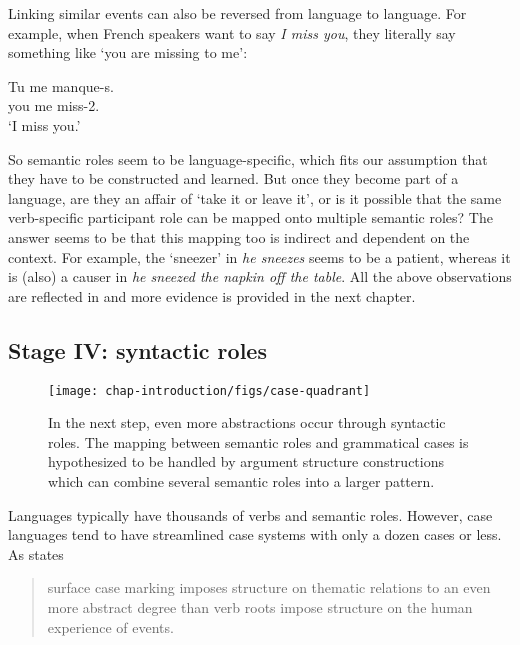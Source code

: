 Linking similar events can also be reversed from language to language. For example, when French speakers want to say {\em I miss you}, they literally say something like `you are missing to me':

\ea
\gll Tu me manque-s. \\
you me miss-2{\sg}.{\prs} \\
\glt `I miss you.' \\
\z


So semantic roles seem to be language-specific, which fits our assumption that they have to be constructed and learned. But once they become part of a language, are they an affair of `take it or leave it', or is it possible that the same verb-specific participant role can be mapped onto multiple semantic roles? The answer seems to be that this mapping too is indirect and dependent on the context. For example, the `sneezer' in {\em he sneezes} seems to be a patient, whereas it is (also) a causer in {\em he sneezed the napkin off the table}. All the above observations are reflected in  and more evidence is provided in the next chapter.

\subsection{Stage IV: syntactic roles}
\label{s:stage4}

\begin{figure}[t]
\centerline{\texttt{[image: chap-introduction/figs/case-quadrant]}}
  \caption[Formation of case markers: stage IV]{In the next step, even more abstractions occur through syntactic roles. The mapping between semantic roles and grammatical cases is hypothesized to be handled by argument structure constructions which can combine several semantic roles into a larger pattern.}
   \label{f:stage4}
\end{figure}

Languages typically have thousands of verbs and semantic roles. However, case languages tend to have streamlined case systems with only a dozen cases or less. As \citet{croft91syntactic} states

\begin{quote}
surface case marking imposes structure on thematic relations to an even more abstract degree than verb roots impose structure on the human experience of events.  \citep[158--159]{croft91syntactic}
\end{quote}

